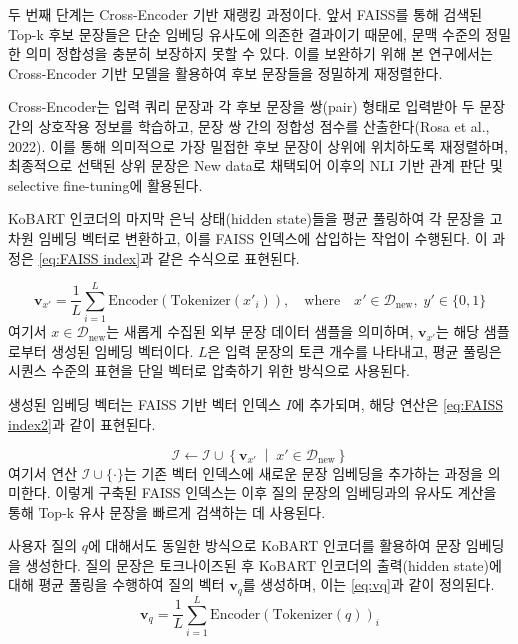 \documentclass[a4paper,fleqn]{cas-sc}
\begin{document}
두 번째 단계는 Cross-Encoder 기반 재랭킹 과정이다. 앞서 FAISS를 통해 검색된 Top-k 후보 문장들은 단순 임베딩 유사도에 의존한 결과이기 때문에, 문맥 수준의 정밀한 의미 정합성을 충분히 보장하지 못할 수 있다. 이를 보완하기 위해 본 연구에서는 Cross-Encoder 기반 모델을 활용하여 후보 문장들을 정밀하게 재정렬한다.

Cross-Encoder는 입력 쿼리 문장과 각 후보 문장을 쌍(pair) 형태로 입력받아 두 문장 간의 상호작용 정보를 학습하고, 문장 쌍 간의 정합성 점수를 산출한다(Rosa et al., 2022). 이를 통해 의미적으로 가장 밀접한 후보 문장이 상위에 위치하도록 재정렬하며, 최종적으로 선택된 상위 문장은 New data로 채택되어 이후의 NLI 기반 관계 판단 및 selective fine-tuning에 활용된다. 

KoBART 인코더의 마지막 은닉 상태(hidden state)들을 평균 풀링하여 각 문장을 고차원 임베딩 벡터로 변환하고, 이를 FAISS 인덱스에 삽입하는 작업이 수행된다. 이 과정은 \cref{eq:FAISS index}과 같은 수식으로 표현된다.

\begin{equation}
    \mathbf{v}_{x'} = \frac{1}{L} \sum_{i=1}^{L} \mathrm{Encoder}(\mathrm{Tokenizer}(x'_i)), \quad \text{where} \quad x' \in \mathcal{D}_{\text{new}}, \; y' \in \{0, 1\}
    \label{eq:FAISS index}
\end{equation}
여기서  \( x \in \mathcal{D}_{\text{new}} \)는 새롭게 수집된 외부 문장 데이터 샘플을 의미하며, \( \mathbf{v}_{x'} \)는 해당 샘플로부터 생성된 임베딩 벡터이다. 
\( L \)은 입력 문장의 토큰 개수를 나타내고, 평균 풀링은 시퀀스 수준의 표현을 단일 벡터로 압축하기 위한 방식으로 사용된다.

생성된 임베딩 벡터는 FAISS 기반 벡터 인덱스 \( I\)에 추가되며, 해당 연산은 \cref{eq:FAISS index2}과 같이 표현된다. 

\begin{equation}
    \mathcal{I} \leftarrow \mathcal{I} \cup \left\{ \mathbf{v}_{x'} \;\middle|\; x' \in \mathcal{D}_{\text{new}} \right\}
    \label{eq:FAISS index2}
\end{equation}
\noindent
여기서 연산 \( \mathcal{I} \cup \{ \cdot \} \)는 기존 벡터 인덱스에 새로운 문장 임베딩을 추가하는 과정을 의미한다. 이렇게 구축된 FAISS 인덱스는 이후 질의 문장의 임베딩과의 유사도 계산을 통해 Top-k 유사 문장을 빠르게 검색하는 데 사용된다. 

사용자 질의 \( q \)에 대해서도 동일한 방식으로 KoBART 인코더를 활용하여 문장 임베딩을 생성한다. 질의 문장은 토크나이즈된 후 KoBART 인코더의 출력(hidden state)에 대해 평균 풀링을 수행하여 질의 벡터 \( \mathbf{v}_{q} \)를 생성하며, 이는 \cref{eq:vq}과 같이 정의된다. 
\begin{equation}
    \mathbf{v}_q = \frac{1}{L} \sum_{i=1}^{L} \mathrm{Encoder}(\mathrm{Tokenizer}(q))_i
    \label{eq:vq}
\end{equation}
\end{document}
